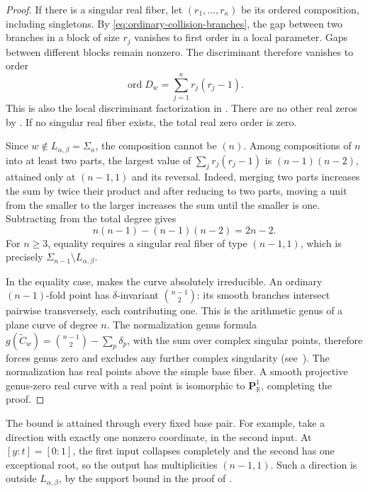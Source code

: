 \documentclass[12pt,reqno]{amsart}
\theoremstyle{definition}
\theoremstyle{remark}
\newcommand{\R}{\mathbb R}
\begin{document}
\begin{proof}
If there is a singular real fiber, let \((r_1,\ldots,r_{\kappa})\) be its
ordered composition, including singletons.  By
\eqref{eq:ordinary-collision-branches}, the gap between two branches
in a block of size \(r_j\) vanishes to first order in a local
parameter.  Gaps between different blocks remain nonzero.  The
discriminant therefore vanishes to order
\begin{equation}\label{eq:real-discriminant-zero-order}
 \operatorname{ord}D_w=\sum_{j=1}^{\kappa} r_j(r_j-1).
\end{equation}
This is also the local discriminant factorization in
.  There are no other real zeros by
.  If no singular real fiber
exists, the total real zero order is zero.

Since \(w\notin L_{\alpha,\beta}=\Sigma_n\), the composition
cannot be \((n)\).  Among compositions of \(n\) into at least two
parts, the largest value of \(\sum_jr_j(r_j-1)\) is
\((n-1)(n-2)\), attained only at \((n-1,1)\) and its reversal.
Indeed, merging two parts increases the sum by twice their product and after reducing to two parts, moving a unit from the smaller to the
larger increases the sum until the smaller is one.  Subtracting from
the total degree gives
\[
 n(n-1)-(n-1)(n-2)=2n-2.
\]
For \(n\geq3\), equality requires a singular real fiber of type
\((n-1,1)\), which is precisely
\(\Sigma_{n-1}\setminus L_{\alpha,\beta}\).

In the equality case, 
makes the curve absolutely irreducible.  An ordinary \((n-1)\)-fold
point has \(\delta\)-invariant \(\binom{n-1}{2}\): its smooth
branches intersect pairwise transversely, each contributing one.  This is
the arithmetic genus of a plane curve of degree \(n\).  The
normalization genus formula
\(g(\widetilde C_w)=\binom{n-1}{2}-\sum_p\delta_p\), with the sum
over complex singular points, therefore forces genus zero and excludes
any further complex singularity (see~\cite[Chapter~IV]{Hartshorne77}).
The normalization has real points above the simple base fiber. A smooth
projective genus-zero real curve with a real point is isomorphic to
\(\mathbf P^1_{\R}\), completing the proof.
\end{proof}

The bound is attained through every fixed base pair.  For example, take
a direction with exactly one nonzero coordinate, in the second input.  At \([y:t]=[0:1]\), the first input collapses completely
and the second has one exceptional root, so the output has
multiplicities \((n-1,1)\).  Such a direction is outside
\(L_{\alpha,\beta}\), by the support bound in the proof of
.
\end{document}
